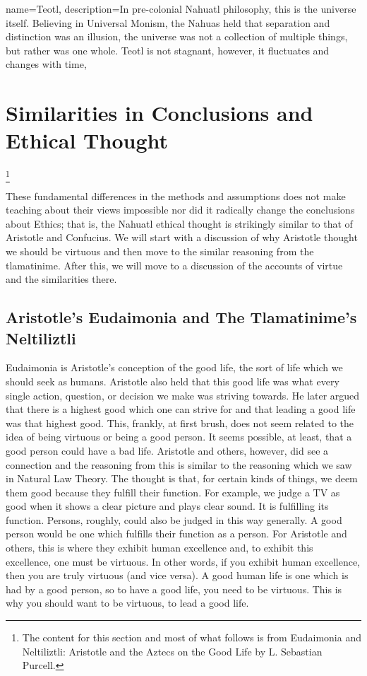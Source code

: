 {
  name=Teotl,
  description={In pre-colonial Nahuatl philosophy, this is the universe itself. Believing in Universal Monism, the Nahuas held that separation and distinction was an illusion, the universe was not a collection of multiple things, but rather was one whole. Teotl is not stagnant, however, it fluctuates and changes with time},
}


\section{Similarities in Conclusions and Ethical Thought}\footnote{The content for this section and most of what follows is from Eudaimonia and Neltiliztli: Aristotle and the Aztecs on the Good Life
by L. Sebastian Purcell.\autocite{Purcell1}} 

These fundamental differences in the methods and assumptions does not make teaching about their views impossible nor did it radically change the conclusions about Ethics; that is, the Nahuatl ethical thought is strikingly similar to that of Aristotle and Confucius. We will start with a discussion of why Aristotle thought we should be virtuous and then move to the similar reasoning from the tlamatinime. After this, we will move to a discussion of the accounts of virtue and the similarities there.

\subsection{Aristotle's Eudaimonia and The Tlamatinime's Neltiliztli} 

Eudaimonia is Aristotle's conception of the good life, the sort of life which we should seek as humans. Aristotle also held that this good life was what every single action, question, or decision we make was striving towards. He later argued that there is a highest good which one can strive for and that leading a good life was that highest good. This, frankly, at first brush, does not seem related to the idea of being virtuous or being a good person. It seems possible, at least, that a good person could have a bad life. Aristotle and others, however, did see a connection and the reasoning from this is similar to the reasoning which we saw in Natural Law Theory. The thought is that, for certain kinds of things, we deem them good because they fulfill their function. For example, we judge a TV as good when it shows a clear picture and plays clear sound. It is fulfilling its function. Persons, roughly, could also be judged in this way generally. A good person would be one which fulfills their function as a person. For Aristotle and others, this is where they exhibit human excellence and, to exhibit this excellence, one must be virtuous. In other words, if you exhibit human excellence, then you are truly virtuous (and vice versa). A good human life is one which is had by a good person, so to have a good life, you need to be virtuous. This is why you should want to be virtuous, to lead a good life. 


